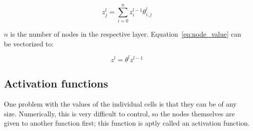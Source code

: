 \begin{equation}
    z^l_j = \sum^n_{i=0}z^{l-1}_i\theta^l_{i, j}
    \label{eq:node_value}
\end{equation}

$n$ is the number of nodes in the respective layer. Equation~\eqref{eq:node_value} can be vectorized to:

\begin{equation}
    z^l = \theta^l z^{l-1}
    \label{eq:node_value_vectorized}
\end{equation}

\subsection{Activation functions}

One problem with the values of the individual cells is that they can be of any size. Numerically, this is very difficult to control, so the nodes themselves are given to another function first; this function is aptly called an activation function.

